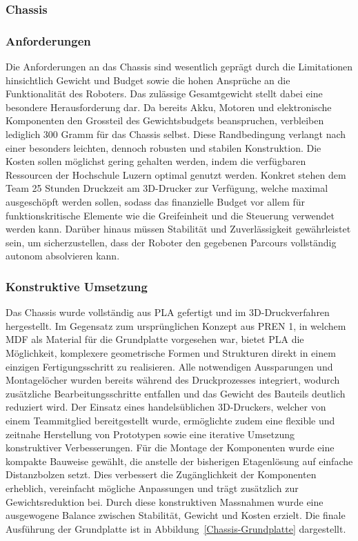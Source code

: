 \documentclass[main.tex]{subfiles} %
\begin{document}

\subsubsection{Chassis}

\subsubsection*{Anforderungen}

Die Anforderungen an das Chassis sind wesentlich geprägt durch die Limitationen 
hinsichtlich Gewicht und Budget sowie die hohen Ansprüche an die Funktionalität 
des Roboters. Das zulässige Gesamtgewicht stellt dabei eine besondere 
Herausforderung dar. Da bereits Akku, Motoren und elektronische Komponenten 
den Grossteil des Gewichtsbudgets beanspruchen, verbleiben lediglich 300 Gramm 
für das Chassis selbst. Diese Randbedingung verlangt nach einer besonders 
leichten, dennoch robusten und stabilen Konstruktion. Die Kosten sollen möglichst 
gering gehalten werden, indem die verfügbaren Ressourcen der Hochschule Luzern 
optimal genutzt werden. Konkret stehen dem Team 25 Stunden Druckzeit am 3D-Drucker 
zur Verfügung, welche maximal ausgeschöpft werden sollen, sodass das finanzielle 
Budget vor allem für funktionskritische Elemente wie die Greifeinheit 
und die Steuerung verwendet werden kann. Darüber hinaus müssen Stabilität und 
Zuverlässigkeit gewährleistet sein, um sicherzustellen, dass der Roboter den 
gegebenen Parcours vollständig autonom absolvieren kann.

\newpage

\subsubsection*{Konstruktive Umsetzung}

Das Chassis wurde vollständig aus PLA gefertigt und im 3D-Druckverfahren 
hergestellt. Im Gegensatz zum ursprünglichen Konzept aus PREN 1, in welchem 
MDF als Material für die Grundplatte vorgesehen war, bietet PLA die 
Möglichkeit, komplexere geometrische Formen und Strukturen direkt in einem 
einzigen Fertigungsschritt zu realisieren. Alle notwendigen Aussparungen 
und Montagelöcher wurden bereits während des Druckprozesses integriert, 
wodurch zusätzliche Bearbeitungsschritte entfallen und das Gewicht des 
Bauteils deutlich reduziert wird. Der Einsatz eines handelsüblichen 
3D-Druckers, welcher von einem Teammitglied bereitgestellt wurde, 
ermöglichte zudem eine flexible und zeitnahe Herstellung von Prototypen 
sowie eine iterative Umsetzung konstruktiver Verbesserungen. Für die Montage 
der Komponenten wurde eine kompakte Bauweise gewählt, die anstelle der 
bisherigen Etagenlösung auf einfache Distanzbolzen setzt. Dies verbessert die 
Zugänglichkeit der Komponenten erheblich, vereinfacht mögliche Anpassungen 
und trägt zusätzlich zur Gewichtsreduktion bei. Durch diese konstruktiven 
Massnahmen wurde eine ausgewogene Balance zwischen Stabilität, Gewicht und 
Kosten erzielt. Die finale Ausführung der Grundplatte ist in 
Abbildung~\ref{Chassis-Grundplatte} dargestellt.
\end{document}
